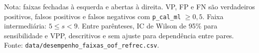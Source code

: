 \begin{table}[!htbp]
\vspace{2pt}
\par\footnotesize Nota: faixas fechadas à esquerda e abertas à direita. VP, FP e FN são verdadeiros positivos, falsos positivos e falsos negativos com \texttt{p\_cal\_ml} $\geq 0{,}5$. Faixa intermediária: $5\leq s<9$. Entre parênteses, IC de Wilson de 95\% para sensibilidade e VPP, descritivos e sem ajuste para dependência entre pares. Fonte: \texttt{data/desempenho\_faixas\_oof\_refrec.csv}.
\end{table}
